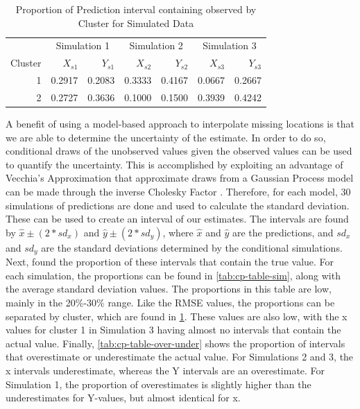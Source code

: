 \documentclass[12pt]{article}
\begin{document}
\begin{table}

\caption{\label{tab:cp-sim-table}Proportion of Prediction interval containing observed by Cluster for Simulated Data}
\centering
\begin{tabular}[t]{rrrrrrr}
\toprule
\multicolumn{1}{c}{ } & \multicolumn{2}{c}{Simulation 1} & \multicolumn{2}{c}{Simulation 2} & \multicolumn{2}{c}{Simulation 3} \\
\cmidrule(l{3pt}r{3pt}){2-3} \cmidrule(l{3pt}r{3pt}){4-5} \cmidrule(l{3pt}r{3pt}){6-7}
Cluster & $X_{s1}$ & $Y_{s1}$ & $X_{s2}$ & $Y_{s2}$ & $X_{s3}$ & $Y_{s3}$\\
\midrule
1 & 0.2917 & 0.2083 & 0.3333 & 0.4167 & 0.0667 & 0.2667\\
2 & 0.2727 & 0.3636 & 0.1000 & 0.1500 & 0.3939 & 0.4242\\
\bottomrule
\end{tabular}
\end{table}

A benefit of using a model-based approach to interpolate missing
locations is that we are able to determine the uncertainty of the
estimate. In order to do so, conditional draws of the unobserved values
given the observed values can be used to quantify the uncertainty. This
is accomplished by exploiting an advantage of Vecchia's Approximation
that approximate draws from a Gaussian Process model can be made through
the inverse Cholesky Factor \citep{guinness_permutation_2018}.
Therefore, for each model, 30 simulations of predictions are done and
used to calculate the standard deviation. These can be used to create an
interval of our estimates. The intervals are found by
\(\hat{x} \pm (2*sd_x)\) and \(\hat{y} \pm (2*sd_y)\), where \(\hat{x}\)
and \(\hat{y}\) are the predictions, and \(sd_x\) and \(sd_y\) are the
standard deviations determined by the conditional simulations. Next,
found the proportion of these intervals that contain the true value. For
each simulation, the proportions can be found in
\cref{tab:cp-table-sim}, along with the average standard deviation
values. The proportions in this table are low, mainly in the 20\%-30\%
range. Like the RMSE values, the proportions can be separated by
cluster, which are found in \cref{tab:cp-sim-table}. These values are
also low, with the x values for cluster 1 in Simulation 3 having almost
no intervals that contain the actual value. Finally,
\cref{tab:cp-table-over-under} shows the proportion of intervals that
overestimate or underestimate the actual value. For Simulations 2 and 3,
the x intervals underestimate, whereas the Y intervals are an
overestimate. For Simulation 1, the proportion of overestimates is
slightly higher than the underestimates for Y-values, but almost
identical for x.
\end{document}
